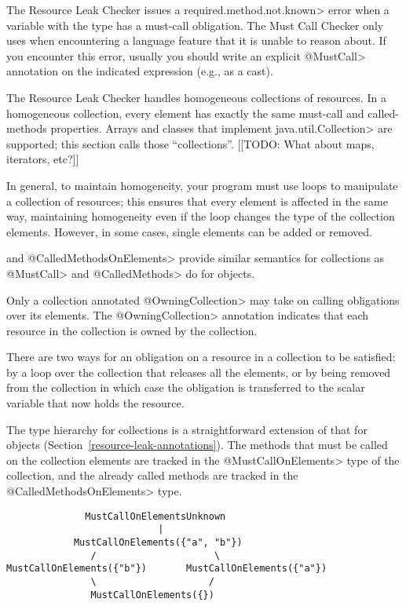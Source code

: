 The Resource Leak Checker issues a \<required.method.not.known> error
when a variable with the type \MustCallUnknown has a must-call obligation.
The Must Call Checker
only uses \MustCallUnknown when encountering a language
feature that it is unable to reason about.
If you encounter this error, usually you should write an explicit \<@MustCall> annotation
on the indicated expression (e.g., as a cast).



The Resource Leak Checker handles homogeneous collections of resources. In a homogeneous collection, every element
has exactly the same must-call and called-methods properties. Arrays and
classes that implement \<java.util.Collection> are supported; this section
calls those ``collections''.
[[TODO: What about maps, iterators, etc?]]

In general, to maintain homogeneity, your program must use loops to
manipulate a collection of resources; this ensures that every element is
affected in the same way, maintaining homogeneity even if the loop changes
the type of the collection elements.  However, in some cases, single elements can
be added or removed.


\MustCallOnElements and \<@CalledMethodsOnElements> provide similar semantics for collections as \<@MustCall> and \<@CalledMethods> do for objects.

Only a collection annotated \<@OwningCollection> may take on calling
obligations over its elements.  The \<@OwningCollection> annotation
indicates that each resource in the collection is owned by the collection.

There are two ways for an obligation on a resource in a collection to be
satisfied:  by a loop over the collection that releases all the elements,
or by being removed from the collection in which case the obligation is
transferred to the scalar variable that now holds the resource.

The type hierarchy for collections is a straightforward extension of that
for objects (Section~\ref{resource-leak-annotations}).
The methods that must be called on the collection elements are tracked in
the \<@MustCallOnElements> type of the collection, and the already called
methods are tracked in the \<@CalledMethodsOnElements> type.

\begin{verbatim}
              MustCallOnElementsUnknown
                           |
            MustCallOnElements({"a", "b"})
               /                     \
MustCallOnElements({"b"})       MustCallOnElements({"a"})
               \                    /
               MustCallOnElements({})
\end{verbatim}

